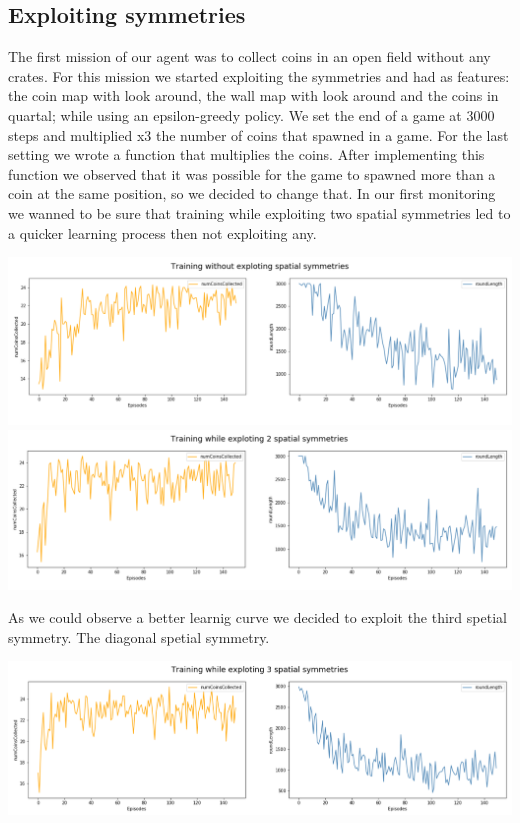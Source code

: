 \subsection{Exploiting symmetries}
The first mission of our agent was to collect coins in an open field without any crates. For this mission we started exploiting the symmetries and had as features: the coin map with look around, the wall map with look around and the coins in quartal; while using an epsilon-greedy policy. We set the end of a game at 3000 steps and multiplied x3 the number of coins that spawned in a game. For the last setting we wrote a function that multiplies the coins. After implementing this function we observed that it was possible for the game to spawned more than a coin at the same position, so we decided to change that. In our first monitoring we wanned to be sure that training while exploiting two spatial symmetries led to a quicker learning process then not exploiting any.
\begin{center}
\includegraphics[scale=0.22]{graphics/plot01.png}
\includegraphics[scale=0.22]{graphics/plot02.png}
\end{center}
As we could observe a better learnig curve we decided to exploit the third spetial symmetry. The diagonal spetial symmetry. 
\begin{center}
\includegraphics[scale=0.22]{graphics/plot03.png}
\end{center}

